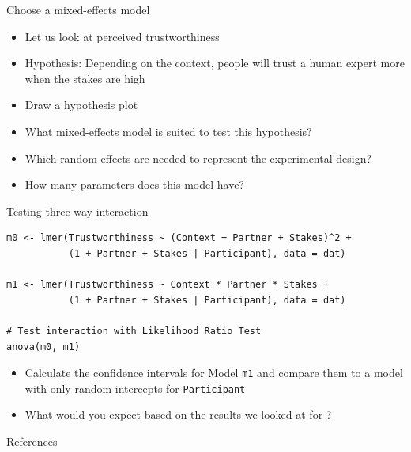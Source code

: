 \documentclass[aspectratio=169]{beamer}
\begin{document}
\begin{frame}[<+->]{Choose a mixed-effects model}
  \begin{itemize}
    \item Let us look at perceived trustworthiness
    \item Hypothesis: Depending on the context, people will trust a human
      expert more when the stakes are high
    \item Draw a hypothesis plot
    \item What mixed-effects model is suited to test this hypothesis?
    \item Which random effects are needed to represent the experimental design?
    \item How many parameters does this model have?
  \end{itemize}
\end{frame}

\begin{frame}[fragile]{Testing three-way interaction}
  \begin{lstlisting}
m0 <- lmer(Trustworthiness ~ (Context + Partner + Stakes)^2 +
           (1 + Partner + Stakes | Participant), data = dat)

m1 <- lmer(Trustworthiness ~ Context * Partner * Stakes +
           (1 + Partner + Stakes | Participant), data = dat)

# Test interaction with Likelihood Ratio Test
anova(m0, m1)
  \end{lstlisting}
  \pause
  \begin{itemize}
    \item Calculate the confidence intervals for Model \texttt{m1} and compare
      them to a model with only random intercepts for \texttt{Participant}
    \item What would you expect based on the results we looked at for
      \citet{Aungle2023}?
  \end{itemize}
\end{frame}

\appendix

\begin{frame}{References}
  \printbibliography
\end{frame}
\end{document}
